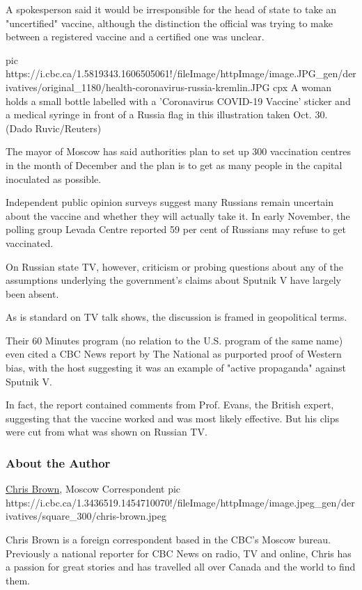 A spokesperson said it would be irresponsible for the head of state to take an
"uncertified" vaccine, although the distinction the official was trying to make
between a registered vaccine and a certified one was unclear.     

\ifcmt
pic https://i.cbc.ca/1.5819343.1606505061!/fileImage/httpImage/image.JPG_gen/derivatives/original_1180/health-coronavirus-russia-kremlin.JPG
cpx A woman holds a small bottle labelled with a 'Coronavirus COVID-19 Vaccine' sticker and a medical syringe in front of a Russia flag in this illustration taken Oct. 30. (Dado Ruvic/Reuters)
\fi

The mayor of Moscow has said authorities plan to set up 300 vaccination centres
in the month of December and the plan is to get as many people in the capital
inoculated as possible.

Independent public opinion surveys suggest many Russians remain uncertain about
the vaccine and whether they will actually take it. In early November, the
polling group Levada Centre reported 59 per cent of Russians may refuse to get
vaccinated.

On Russian state TV, however, criticism or probing questions about any of the
assumptions underlying the government's claims about Sputnik V have largely
been absent.     

As is standard on TV talk shows, the discussion is framed in geopolitical
terms.

Their 60 Minutes program (no relation to the U.S. program of the same name)
even cited a CBC News report by The National as purported proof of Western
bias, with the host suggesting it was an example of "active propaganda" against
Sputnik V.   

In fact, the report contained comments from Prof. Evans, the British expert,
suggesting that the vaccine worked and was most likely effective. But his clips
were cut from what was shown on Russian TV.

\subsubsection{About the Author}

\href{https://www.cbc.ca/news/canada/british-columbia/chris-brown-1.3436494}{Chris Brown}, Moscow Correspondent
\ifcmt
pic https://i.cbc.ca/1.3436519.1454710070!/fileImage/httpImage/image.jpeg_gen/derivatives/square_300/chris-brown.jpeg
\fi

Chris Brown is a foreign correspondent based in the CBC’s Moscow bureau.
Previously a national reporter for CBC News on radio, TV and online, Chris has
a passion for great stories and has travelled all over Canada and the world to
find them.
